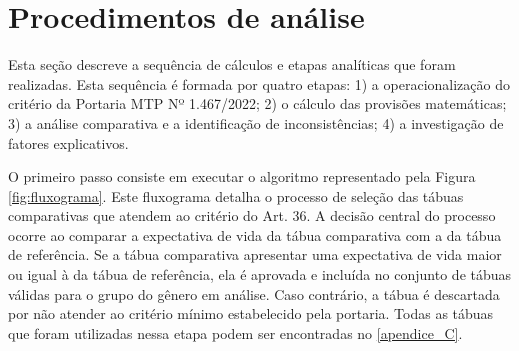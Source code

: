 \section{\textbf{Procedimentos de análise}}
Esta seção descreve a sequência de cálculos e etapas analíticas que foram realizadas. Esta sequência é formada por quatro etapas: 1) a operacionalização do critério da Portaria MTP Nº 1.467/2022; 2) o cálculo das provisões matemáticas; 3) a análise comparativa e a identificação de inconsistências; 4) a investigação de fatores explicativos. 

O primeiro passo consiste em executar o algoritmo representado pela Figura \ref{fig:fluxograma}. Este fluxograma detalha o processo de seleção das tábuas comparativas que atendem ao critério do Art. 36. A decisão central do processo ocorre ao comparar a expectativa de vida da tábua comparativa com a da tábua de referência. Se a tábua comparativa apresentar uma expectativa de vida maior ou igual à da tábua de referência, ela é aprovada e incluída no conjunto de tábuas válidas para o grupo do gênero em análise. Caso contrário, a tábua é descartada por não atender ao critério mínimo estabelecido pela portaria. Todas as tábuas que foram utilizadas nessa etapa podem ser encontradas no \ref{apendice_C}.

